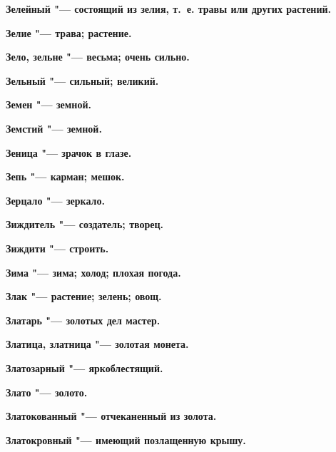 \begin{mymulticols}{2}
\bfseries Зелейный\normalfont{} "--- состоящий из зелия, т.~е. травы или других растений. 




\bfseries Зелие\normalfont{} "--- трава; растение. 




\bfseries Зело, зельне\normalfont{} "--- весьма; очень сильно. 




\bfseries Зельный\normalfont{} "--- сильный; великий. 




\bfseries Земен\normalfont{} "--- земной. 




\bfseries Земстий\normalfont{} "--- земной. 




\bfseries Зеница\normalfont{} "--- зрачок в глазе. 




\bfseries Зепь\normalfont{} "--- карман; мешок. 




\bfseries Зерцало\normalfont{} "--- зеркало. 




\bfseries Зиждитель\normalfont{} "--- создатель; творец. 




\bfseries Зиждити\normalfont{} "--- строить. 




\bfseries Зима\normalfont{} "--- зима; холод; плохая погода. 




\bfseries Злак\normalfont{} "--- растение; зелень; овощ. 




\bfseries Златарь\normalfont{} "--- золотых дел мастер. 




\bfseries Златица, златница\normalfont{} "--- золотая монета. 




\bfseries Златозарный\normalfont{} "--- яркоблестящий. 




\bfseries Злато\normalfont{} "--- золото. 




\bfseries Златокованный\normalfont{} "--- отчеканенный из золота. 




\bfseries Златокровный\normalfont{} "--- имеющий позлащенную крышу. 





\end{mymulticols}
